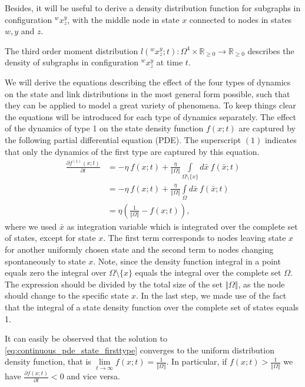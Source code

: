 Besides, it will be useful to derive a density distribution function for subgraphs in configuration $^wx^y_z$, with the middle node in state $x$ connected to nodes in states $w,y$ and $z$. 
\begin{definition}
	The third order moment distribution $l(^wx^y_z;t): \Omega^4 \times \mathbb{R}_{\ge0}  \to \mathbb{R}_{\ge0}$ describes the density of subgraphs in configuration $^wx^y_z$ at time $t$.
\end{definition}
We will derive the equations describing the effect of the four types of dynamics on the state and link distributions in the most general form possible, such that they can be applied to model a great variety of phenomena. To keep things clear the equations will be introduced for each type of dynamics separately. The effect of the dynamics of type 1 on the state density function $f(x;t)$ are captured by the following partial differential equation (PDE). The superscript $(1)$ indicates that only the dynamics of the first type are captured by this equation.
\begin{equation}
\begin{aligned}
    \frac{\partial f^{(1)}(x;t)}{\partial t} 
    &= -  \eta \ f(x;t) + \frac{\eta}{\Vert \Omega \Vert}  \int\limits_{\Omega \setminus \{x\}} d\bar{x} \ f(\bar{x};t) \\
    &= - \eta\ f(x;t) + \frac{\eta}{\Vert \Omega \Vert} \int\limits_{\Omega} d\bar{x}\ f(\bar{x};t)  \\
    &= \eta \left( \frac{1}{\Vert \Omega \Vert} - f(x;t) \right),
    \label{eq:continuous_pde_state_firsttype}
\end{aligned}
\end{equation}
where we used $\bar{x}$ as integration variable which is integrated over the complete set of states, except for state $x$. The first term corresponds to nodes leaving state $x$ for another uniformly chosen state and the second term to nodes changing spontaneously to state $x$. Note, since the density function integral in a point equals zero the integral over $\Omega \setminus \{x\}$ equals the integral over the complete set $\Omega$. The expression should be divided by the total size of the set $\Vert \Omega \Vert$, as the node should change to the specific state $x$. In the last step, we made use of the fact that the integral of a state density function over the complete set of states equals 1. 

It can easily be observed that the solution to \cref{eq:continuous_pde_state_firsttype} converges to the uniform distribution density function, that is $ \lim\limits_{t \to \infty} f(x;t) = \frac{1}{\Vert \Omega \Vert}$. In particular, if $f(x;t) > \frac{1}{\Vert \Omega \Vert}$ we have $\frac{\partial f(x;t)}{\partial t} < 0$ and vice versa. 

